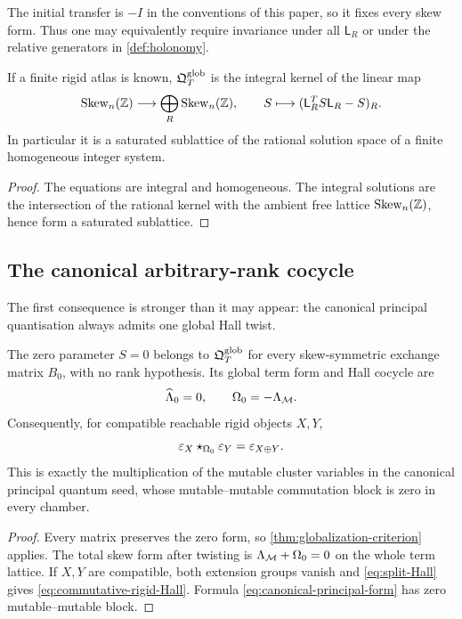The initial transfer is $-I$ in the conventions of this paper, so it fixes
every skew form.  Thus one may equivalently require invariance under all
$\mathsf L_R$ or under the relative generators in \cref{def:holonomy}.

\begin{corollary}
\label{cor:linear-computation}
If a finite rigid atlas is known, $\mathfrak Q^{\mathrm{glob}}_T$ is the integral kernel of the
linear map
\[
 \operatorname{Skew}_n(\mathbb Z)\longrightarrow
 \bigoplus_R\operatorname{Skew}_n(\mathbb Z),
 \qquad
 S\longmapsto(\mathsf L_R^TS\mathsf L_R-S)_R.
\]
In particular it is a saturated sublattice of the rational solution space of
a finite homogeneous integer system.
\end{corollary}

\begin{proof}
The equations are integral and homogeneous.  The integral solutions are the
intersection of the rational kernel with the ambient free lattice
$\operatorname{Skew}_n(\mathbb Z)$, hence form a saturated sublattice.
\end{proof}

\subsection{The canonical arbitrary-rank cocycle}

The first consequence is stronger than it may appear: the canonical principal
quantisation always admits one global Hall twist.

\begin{corollary}
\label{cor:zero-globalizes}
The zero parameter $S=0$ belongs to $\mathfrak Q^{\mathrm{glob}}_T$ for every skew-symmetric
exchange matrix $B_0$, with no rank hypothesis.  Its global term form and
Hall cocycle are
\begin{equation}
 \widehat\Lambda_0=0,
 \qquad
 \Omega_0=-\Lambda_{\mathcal M}.
 \label{eq:zero-cocycle}
\end{equation}
Consequently, for compatible reachable rigid objects $X,Y$,
\begin{equation}
 \varepsilon_X\star_{\Omega_0}\varepsilon_Y=\varepsilon_{X\oplus Y}.
 \label{eq:commutative-rigid-Hall}
\end{equation}
This is exactly the multiplication of the mutable cluster variables in the
canonical principal quantum seed, whose mutable--mutable commutation block is
zero in every chamber.
\end{corollary}

\begin{proof}
Every matrix preserves the zero form, so
\cref{thm:globalization-criterion} applies.  The total skew form after twisting
is
$\Lambda_{\mathcal M}+\Omega_0=0$ on the whole term lattice.  If $X,Y$ are
compatible, both extension groups vanish and \cref{eq:split-Hall} gives
\cref{eq:commutative-rigid-Hall}.  Formula
\cref{eq:canonical-principal-form} has zero mutable--mutable block.
\end{proof}


